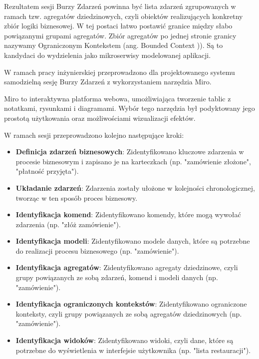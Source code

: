Rezultatem sesji Burzy Zdarzeń powinna być lista zdarzeń zgrupowanych w ramach tzw. agregatów dziedzinowych, czyli obiektów realizujących konkretny zbiór logiki biznesowej. W tej postaci łatwo postawić granice między słabo powiązanymi grupami agregatów. Zbiór agregatów po jednej stronie granicy nazywamy Ograniczonym Kontekstem (ang. Bounded Context \cite{boundedcontext})). Są to kandydaci do wydzielenia jako mikroserwisy modelowanej aplikacji.

W ramach pracy inżynierskiej przeprowadzono dla projektowanego systemu samodzielną sesję Burzy Zdarzeń z wykorzystaniem narzędzia Miro.

Miro \cite{miro} to interaktywna platforma webowa, umożliwiająca tworzenie tablic z notatkami, rysunkami i diagramami. Wybór tego narzędzia był podyktowany jego prostotą użytkowania oraz możliwościami wizualizacji efektów.

W ramach sesji przeprowadzono kolejno następujące kroki:

\begin{itemize}

    \item \textbf{Definicja zdarzeń biznesowych}: Zidentyfikowano kluczowe zdarzenia w procesie biznesowym i zapisano je na karteczkach (np. "zamówienie złożone", "płatność przyjęta").
    \item \textbf{Układanie zdarzeń}: Zdarzenia zostały ułożone w kolejności chronologicznej, tworząc w ten sposób proces biznesowy.
    \item \textbf{Identyfikacja komend}: Zidentyfikowano komendy, które mogą wywołać zdarzenia (np. "złóż zamówienie").
    \item \textbf{Identyfikacja modeli}: Zidentyfikowano modele danych, które są potrzebne do realizacji procesu biznesowego (np. "zamówienie").
    \item \textbf{Identyfikacja agregatów}: Zidentyfikowano agregaty dziedzinowe, czyli grupy powiązanych ze sobą zdarzeń, komend i modeli danych (np. "zamówienie").
    \item \textbf{Identyfikacja ograniczonych kontekstów}: Zidentyfikowano ograniczone konteksty, czyli grupy powiązanych ze sobą agregatów dziedzinowych (np. "zamówienie").
    \item \textbf{Identyfikacja widoków}: Zidentyfikowano widoki, czyli dane, które są potrzebne do wyświetlenia w interfejsie użytkownika (np. "lista restauracji").

\end{itemize}

